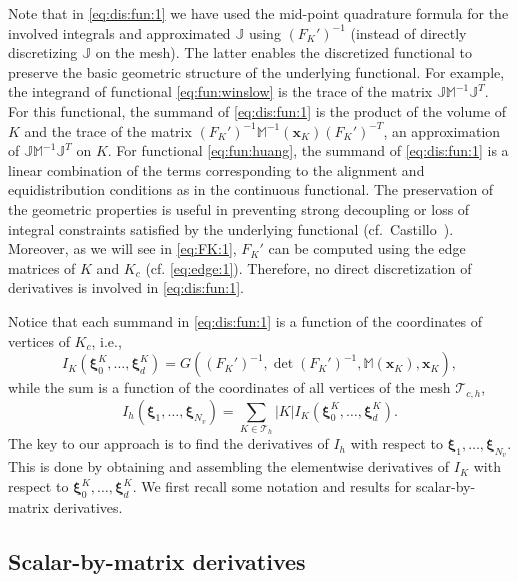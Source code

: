\documentclass[american]{scrartcl}
\providecommand{\Abs}[1]{\left\lvert#1\right\rvert}
\providecommand{\V}[1]{\boldsymbol{#1}}
\providecommand{\Th}{\mathcal{T}_h}
\providecommand{\Thc}{\mathcal{T}_{c,h}}
\providecommand{\M}{\mathbb{M}}
\providecommand{\J}{\mathbb{J}}
\providecommand{\JMJ}{\J \M^{-1}\J^T}
\theoremstyle{remark}
\begin{document}
Note that in \cref{eq:dis:fun:1} we have used the mid-point quadrature formula for the involved integrals and approximated $\J$ using ${(F_K')}^{-1}$ (instead of directly discretizing $\J$ on the mesh).
The latter enables the discretized functional to preserve the basic geometric structure of the underlying functional.
For example, the integrand of functional \cref{eq:fun:winslow} is the trace of the matrix $\JMJ$.
For this functional, the summand of \cref{eq:dis:fun:1} is the product of the volume of $K$ and the trace of the matrix ${(F_K')}^{-1} \M^{-1}(\V{x}_K)  {(F_K')}^{-T}$, an approximation of $\JMJ$ on $K$.
For functional \cref{eq:fun:huang}, the summand of \cref{eq:dis:fun:1} is a linear combination of the terms corresponding to the alignment and equidistribution conditions as in the continuous functional.
The preservation of the geometric properties is useful in preventing strong decoupling or loss of integral constraints satisfied by the underlying functional (cf.\ Castillo~\cite{Cas86}).
Moreover, as we will see in \cref{eq:FK:1}, $F_K'$ can be computed using the edge matrices of $K$ and $K_c$ (cf. \cref{eq:edge:1}).
Therefore, no direct discretization of derivatives is involved in \cref{eq:dis:fun:1}.

Notice that each summand in \cref{eq:dis:fun:1} is a function of the coordinates of vertices of $K_c$, i.e., 
\begin{equation}
   I_K(\V{\xi}_0^K, \dotsc,  \V{\xi}_d^K) 
      = G \left( {(F_K')}^{-1}, \det{(F_K')}^{-1}, \M(\V{x}_K), \V{x}_K \right)
   ,
   \label{eq:IK:1}
\end{equation}
while the sum is a function of the coordinates of all vertices of the mesh $\Thc$,
\begin{equation}
   I_h(\V{\xi}_1, \dotsc, \V{\xi}_{N_v}) 
      = \sum\limits_{K \in \Th} \Abs{K} I_K \left(\V{\xi}_0^K, \dotsc,  \V{\xi}_d^K \right)
      .
   \label{eq:Ih:1}
\end{equation}
The key to our approach is to find the derivatives of $I_h$ with respect to $\V{\xi}_1, \dotsc, \V{\xi}_{N_v}$.
This is done by obtaining and assembling the elementwise derivatives of $I_K$ with respect to $\V{\xi}_0^K, \dotsc,  \V{\xi}_d^K$.
We first recall some notation and results for scalar-by-matrix derivatives.

\subsection{Scalar-by-matrix derivatives}
\label{SEC:scalar-by-matrix-der}
\end{document}

